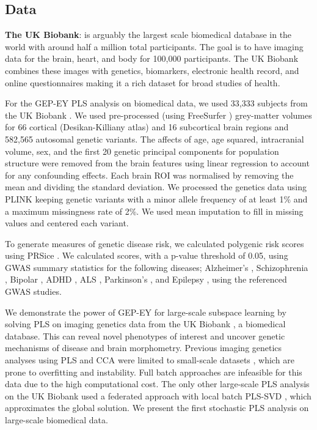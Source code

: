\subsection{Data}
\textbf{The UK Biobank}: is arguably the largest scale biomedical database in the world with around half a
million
total participants. The goal is to have imaging data for the brain, heart, and body for 100,000 participants. The UK Biobank combines these images with genetics, biomarkers, electronic health record, and online questionnaires making it a rich dataset for broad studies of health.

For the GEP-EY PLS analysis on biomedical data, we used 33,333 subjects from the UK Biobank \cite{sudlow2015uk}. We used pre-processed (using FreeSurfer \cite{Fischl2012}) grey-matter volumes for 66 cortical (Desikan-Killiany atlas) and 16 subcortical brain regions and 582,565 autosomal genetic variants. The affects of age, age squared, intracranial volume, sex, and the first 20 genetic principal components for population structure were removed from the brain features using linear regression to account for any confounding effects. Each brain ROI was normalised by removing the mean and dividing the standard deviation. We processed the genetics data using PLINK \cite{Purcell2007} keeping genetic variants with a minor allele frequency of at least 1\%  and a maximum missingness rate of 2\%. We used mean imputation to fill in missing values and centered each variant.

To generate measures of genetic disease risk, we calculated polygenic risk scores using PRSice \cite{PRSice2014}. We calculated scores, with a p-value threshold of 0.05, using GWAS summary statistics for the following diseases; Alzheimer's \cite{Lambert2013}, Schizophrenia \cite{Trubetskoy2022}, Bipolar \cite{Mullins2021}, ADHD \cite{Demontis2023}, ALS \cite{Van_Rheenen2021}, Parkinson's \cite{Nalls2019}, and Epilepsy \cite{International_League_Against_Epilepsy_Consortium_on_Complex_Epilepsies2018}, using the referenced GWAS studies.

We demonstrate the power of GEP-EY for large-scale subspace learning by solving PLS on imaging genetics data from the UK Biobank \cite{sudlow2015uk}, a biomedical database.
This can reveal novel phenotypes of interest and uncover genetic mechanisms of disease and brain morphometry.
Previous imaging genetics analyses using PLS and CCA were limited to small-scale datasets \cite{Lorenzi2018,Taquet2021,Lefloch2012}, which are prone to overfitting and instability.
Full batch approaches are infeasible for this data due to the high computational cost.
The only other large-scale PLS analysis on the UK Biobank used a federated approach with local batch PLS-SVD \cite{lorenzi2016}, which approximates the global solution.
We present the first stochastic PLS analysis on large-scale biomedical data.

